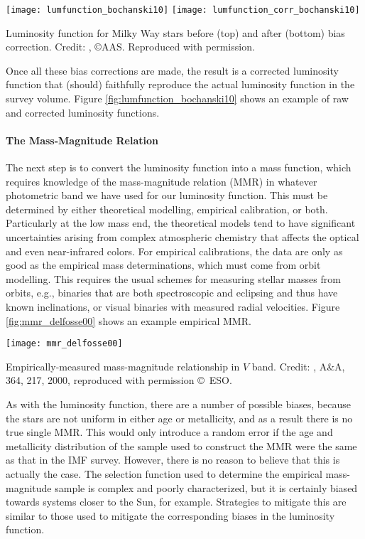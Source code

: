 \begin{marginfigure}
\texttt{[image: lumfunction\_bochanski10]}
\texttt{[image: lumfunction\_corr\_bochanski10]}
\caption[Color-magnitude diagram of nearby stars]{
\label{fig:lumfunction_bochanski10}
Luminosity function for Milky Way stars before (top) and after (bottom) bias correction. Credit: \citet{bochanski10a}, \copyright AAS. Reproduced with permission.
}
\end{marginfigure}

Once all these bias corrections are made, the result is a corrected luminosity function that (should) faithfully reproduce the actual luminosity function in the survey volume. Figure \ref{fig:lumfunction_bochanski10} shows an example of raw and corrected luminosity functions.


\paragraph{The Mass-Magnitude Relation}

The next step is to convert the luminosity function into a mass function, which requires knowledge of the mass-magnitude relation (MMR) in whatever photometric band we have used for our luminosity function. This must be determined by either theoretical modelling, empirical calibration, or both. Particularly at the low mass end, the theoretical models tend to have significant uncertainties arising from complex atmospheric chemistry that affects the optical and even near-infrared colors. 
For empirical calibrations, the data are only as good as the empirical mass determinations, which must come from orbit modelling. This requires the usual schemes for measuring stellar masses from orbits, e.g., binaries that are both spectroscopic and eclipsing and thus have known inclinations, or visual binaries with measured radial velocities. Figure \ref{fig:mmr_delfosse00} shows an example empirical MMR.

\begin{marginfigure}
\texttt{[image: mmr\_delfosse00]}
\caption[Mass-magnitude relationship]{
\label{fig:mmr_delfosse00}
Empirically-measured mass-magnitude relationship in $V$ band. Credit: \citeauthor{delfosse00a}, A\&A, 364, 217, 2000, reproduced with permission \copyright\, ESO.
}
\end{marginfigure}

As with the luminosity function, there are a number of possible biases, because the stars are not uniform in either age or metallicity, and as a result there is no true single MMR. This would only introduce a random error if the age and metallicity distribution of the sample used to construct the MMR were the same as that in the IMF survey. However, there is no reason to believe that this is actually the case. The selection function used to determine the empirical mass-magnitude sample is complex and poorly characterized, but it is certainly biased towards systems closer to the Sun, for example. Strategies to mitigate this are similar to those used to mitigate the corresponding biases in the luminosity function.

